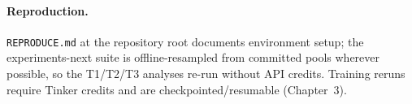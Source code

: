 \paragraph{Reproduction.} \texttt{REPRODUCE.md} at the repository root
documents environment setup; the experiments-next suite is offline-resampled
from committed pools wherever possible, so the T1/T2/T3 analyses re-run
without API credits. Training reruns require Tinker credits and are
checkpointed/resumable (Chapter~3).
